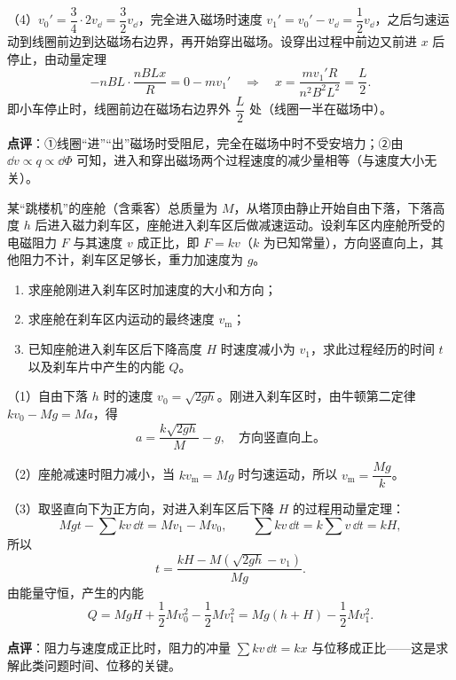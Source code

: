 \begin{liti}
\begin{jiexi}[8cm]
（4）$v_0'=\dfrac34\cdot2v_{\dd}=\dfrac32v_{\dd}$，完全进入磁场时速度 $v_1'=v_0'-v_{\dd}=\dfrac12v_{\dd}$，之后匀速运动到线圈前边到达磁场右边界，再开始穿出磁场。设穿出过程中前边又前进 $x$ 后停止，由动量定理
\[-nBL\cdot\frac{nBLx}{R}=0-mv_1'\quad\Longrightarrow\quad x=\frac{mv_1'R}{n^2B^2L^2}=\frac{L}{2}.\]
即小车停止时，线圈前边在磁场右边界外 $\dfrac L2$ 处（线圈一半在磁场中）。

\textbf{点评}：①线圈“进”“出”磁场时受阻尼，完全在磁场中时不受安培力；②由 $\dd v\propto q\propto\dd\Phi$ 可知，进入和穿出磁场两个过程速度的减少量相等（与速度大小无关）。
\end{jiexi}
\end{liti}

\begin{liti}
某“跳楼机”的座舱（含乘客）总质量为 $M$，从塔顶由静止开始自由下落，下落高度 $h$ 后进入磁力刹车区，座舱进入刹车区后做减速运动。设刹车区内座舱所受的电磁阻力 $F$ 与其速度 $v$ 成正比，即 $F=kv$（$k$ 为已知常量），方向竖直向上，其他阻力不计，刹车区足够长，重力加速度为 $g$。
\begin{enumerate}[label=（\arabic*）,leftmargin=2.6em]
  \item 求座舱刚进入刹车区时加速度的大小和方向；
  \item 求座舱在刹车区内运动的最终速度 $v_{\mathrm m}$；
  \item 已知座舱进入刹车区后下降高度 $H$ 时速度减小为 $v_1$，求此过程经历的时间 $t$ 以及刹车片中产生的内能 $Q$。
\end{enumerate}
\begin{jiexi}[6cm]
（1）自由下落 $h$ 时的速度 $v_0=\sqrt{2gh}$。刚进入刹车区时，由牛顿第二定律 $kv_0-Mg=Ma$，得
\[a=\frac{k\sqrt{2gh}}{M}-g,\quad\text{方向竖直向上。}\]

（2）座舱减速时阻力减小，当 $kv_{\mathrm m}=Mg$ 时匀速运动，所以 $v_{\mathrm m}=\dfrac{Mg}{k}$。

（3）取竖直向下为正方向，对进入刹车区后下降 $H$ 的过程用动量定理：
\[Mgt-\sum kv\,\dd t=Mv_1-Mv_0,\qquad \sum kv\,\dd t=k\sum v\,\dd t=kH,\]
所以
\[t=\frac{kH-M\left(\sqrt{2gh}-v_1\right)}{Mg}.\]
由能量守恒，产生的内能
\[Q=MgH+\frac12Mv_0^2-\frac12Mv_1^2=Mg(h+H)-\frac12Mv_1^2.\]

\textbf{点评}：阻力与速度成正比时，阻力的冲量 $\sum kv\,\dd t=kx$ 与位移成正比——这是求解此类问题时间、位移的关键。
\end{jiexi}
\end{liti}

